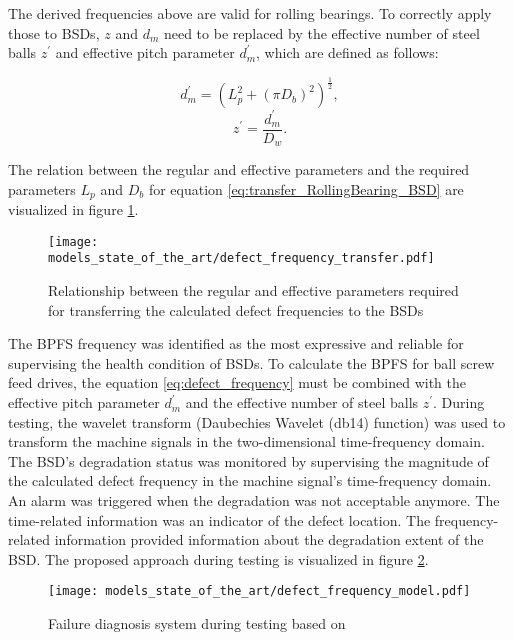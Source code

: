 The derived frequencies above are valid for rolling bearings. To correctly apply those to BSDs, $z$ and $d_{m}$ need to be replaced by the effective number of steel balls $z^{'}$ and effective pitch parameter $d_{m}^{'}$, which are defined as follows:

\begin{equation} \label{eq:transfer_RollingBearing_BSD}
    d_{m}^{'} = (L_{p}^{2}+(\pi D_{b})^{2})^{\frac{1}{2}},
\end{equation}
\begin{equation}
    z^{'} = \frac{d_{m}^{'}}{D_{w}}.
\end{equation}

The relation between the regular and effective parameters and the required parameters $L_{p}$ and $D_{b}$ for equation  \ref{eq:transfer_RollingBearing_BSD} are visualized in figure \ref{fig:defect_frequency_transfer}. 

\begin{figure}[H]
  \centering
  \texttt{[image: models\_state\_of\_the\_art/defect\_frequency\_transfer.pdf]}
  \caption{Relationship between the regular and effective parameters required for transferring the calculated defect frequencies to the BSDs \cite{Lee2015}}
  \label{fig:defect_frequency_transfer}
\end{figure}

The BPFS frequency was identified as the most expressive and reliable for supervising the health condition of BSDs. To calculate the BPFS for ball screw feed drives, the equation \ref{eq:defect_frequency} must be combined with the effective pitch parameter $d_{m}^{'}$ and the effective number of steel balls $z^{'}$. During testing, the wavelet transform (Daubechies Wavelet (db14) function) was used to transform the machine signals in the two-dimensional time-frequency domain. The BSD's degradation status was monitored by supervising the magnitude of the calculated defect frequency in the machine signal's time-frequency domain. An alarm was triggered when the degradation was not acceptable anymore. The time-related information was an indicator of the defect location. The frequency-related information provided information about the degradation extent of the BSD. The proposed approach during testing is visualized in figure \ref{fig:defect_frequency_model}. 


\begin{figure}[H]
  \centering
  \texttt{[image: models\_state\_of\_the\_art/defect\_frequency\_model.pdf]}
  \caption{Failure diagnosis system during testing based on \cite{Lee2015}}
  \label{fig:defect_frequency_model}
\end{figure}

